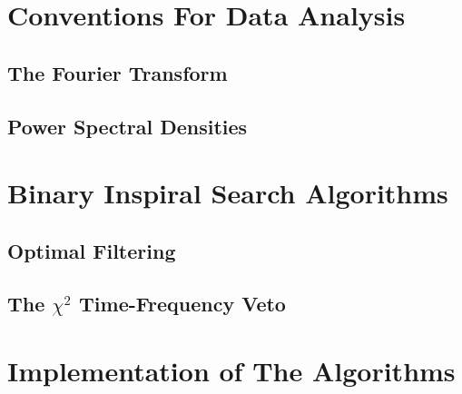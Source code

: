 
\section{Conventions For Data Analysis}

\subsection{The Fourier Transform}

\subsection{Power Spectral Densities}

\section{Binary Inspiral Search Algorithms}

\subsection{Optimal Filtering}

\subsection{The $\chi^2$ Time-Frequency Veto}

\section{Implementation of The Algorithms}

